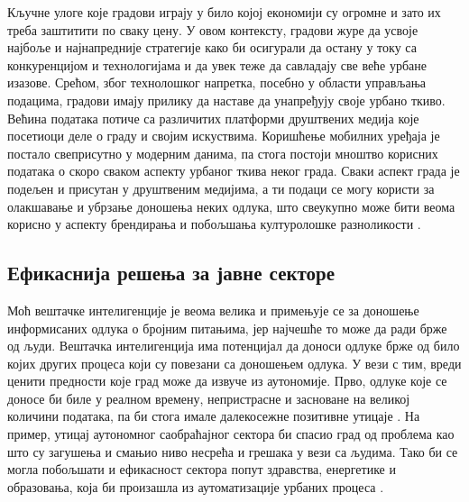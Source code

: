 \documentclass{article}
\begin{document}
Кључне улоге које градови играју у било којој економији су огромне и зато их треба заштитити по сваку цену. У овом контексту, градови журе да усвоје најбоље и најнапредније стратегије како би осигурали да остану у току са конкуренцијом и технологијама и да увек теже да савладају све веће урбане изазове. Срећом, због технолошког напретка, посебно у области управљања подацима, градови имају прилику да наставе да унапређују своје урбано ткиво. Већина података потиче са различитих платформи друштвених медија које посетиоци деле о граду и својим искуствима. Коришћење мобилних уређаја је постало свеприсутно у модерним данима, па стога постоји мноштво корисних података о скоро сваком аспекту урбаног ткива неког града. Сваки аспект града је подељен и присутан у друштвеним медијима, а ти подаци се могу користи за олакшавање и убрзање доношења неких одлука, што свеукупно може бити веома корисно у аспекту брендирања и побољшања културолошке разноликости \cite{alamjr}.

\subsection{Ефикаснија решења за јавне секторе}
Моћ вештачке интелигенције је веома велика и примењује се за доношење информисаних одлука о бројним питањима, јер најчешће то може да ради брже од људи. Вештачка интелигенција има потенцијал да доноси одлуке брже од било којих других процеса који су повезани са доношењем одлука. У вези с тим, вреди ценити предности које град може да извуче из аутономије. Прво, одлуке које се доносе би биле у реалном времену, непристрасне и засноване на великој количини података, па би стога имале далекосежне позитивне утицаје \cite{mohamed}. На пример, утицај аутономног саобраћајног сектора би спасио град од проблема као што су загушења и смањио ниво несрећа и грешака у вези са људима. Тако би се могла побољшати и ефикасност сектора попут здравства, енергетике и образовања, која би произашла из аутоматизације урбаних процеса \cite{norman}.
\end{document}
